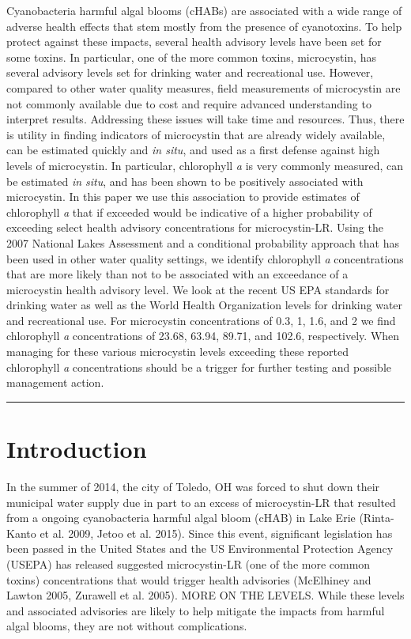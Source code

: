 \documentclass[11pt,]{article}
\begin{document}
Cyanobacteria harmful algal blooms (cHABs) are associated with a wide
range of adverse health effects that stem mostly from the presence of
cyanotoxins. To help protect against these impacts, several health
advisory levels have been set for some toxins. In particular, one of the
more common toxins, microcystin, has several advisory levels set for
drinking water and recreational use. However, compared to other water
quality measures, field measurements of microcystin are not commonly
available due to cost and require advanced understanding to interpret
results. Addressing these issues will take time and resources. Thus,
there is utility in finding indicators of microcystin that are already
widely available, can be estimated quickly and \emph{in situ}, and used
as a first defense against high levels of microcystin. In particular,
chlorophyll \emph{a} is very commonly measured, can be estimated
\emph{in situ}, and has been shown to be positively associated with
microcystin. In this paper we use this association to provide estimates
of chlorophyll \emph{a} that if exceeded would be indicative of a higher
probability of exceeding select health advisory concentrations for
microcystin-LR. Using the 2007 National Lakes Assessment and a
conditional probability approach that has been used in other water
quality settings, we identify chlorophyll \emph{a} concentrations that
are more likely than not to be associated with an exceedance of a
microcystin health advisory level. We look at the recent US EPA
standards for drinking water as well as the World Health Organization
levels for drinking water and recreational use. For microcystin
concentrations of 0.3, 1, 1.6, and 2 we find chlorophyll \emph{a}
concentrations of 23.68, 63.94, 89.71, and 102.6, respectively. When
managing for these various microcystin levels exceeding these reported
chlorophyll \emph{a} concentrations should be a trigger for further
testing and possible management action.

\vspace{3mm}

\hrule

\doublespace

\section{Introduction}\label{introduction}

In the summer of 2014, the city of Toledo, OH was forced to shut down
their municipal water supply due in part to an excess of microcystin-LR
that resulted from a ongoing cyanobacteria harmful algal bloom (cHAB) in
Lake Erie (Rinta-Kanto et al. 2009, Jetoo et al. 2015). Since this
event, significant legislation has been passed in the United States and
the US Environmental Protection Agency (USEPA) has released suggested
microcystin-LR (one of the more common toxins) concentrations that would
trigger health advisories (McElhiney and Lawton 2005, Zurawell et al.
2005). MORE ON THE LEVELS. While these levels and associated advisories
are likely to help mitigate the impacts from harmful algal blooms, they
are not without complications.
\end{document}
